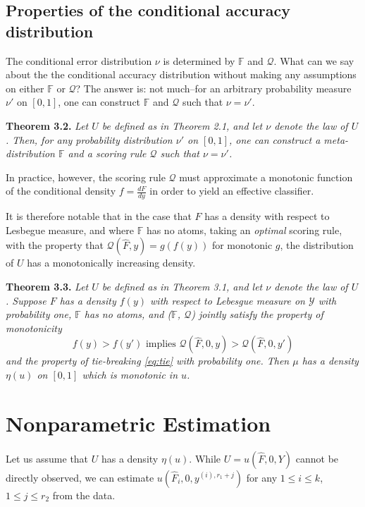 \documentclass{article}
\begin{document}
\subsection{Properties of the conditional accuracy distribution}

The conditional error distribution $\nu$ is determined by $\mathbb{F}$
and $\mathcal{Q}$.  What can we say about the the conditional accuracy
distribution without making any assumptions on either $\mathbb{F}$ or
$\mathcal{Q}$?  The answer is: not much--for an arbitrary probability
measure $\nu'$ on $[0,1]$, one can construct $\mathbb{F}$ and
$\mathcal{Q}$ such that $\nu = \nu'$.

\noindent\textbf{Theorem 3.2.} \emph{ Let $U$ be defined as in Theorem
  2.1, and let $\nu$ denote the law of $U$.  Then, for any probability
  distribution $\nu'$ on $[0,1]$, one can construct a
  meta-distribution $\mathbb{F}$ and a scoring rule $\mathcal{Q}$ such
  that $\nu = \nu'$.  }

In practice, however, the scoring rule $\mathcal{Q}$ must approximate
a monotonic function of the conditional density $f = \frac{dF}{dy}$ in order to
yield an effective classifier.

It is therefore notable that in the case that $F$ has a density with
respect to Lesbegue measure, and where $\mathbb{F}$ has no atoms,
taking an \emph{optimal} scoring rule, with the property that
$\mathcal{Q}(\hat{F}, y) = g(f(y))$ for monotonic $g$, the
distribution of $U$ has a monotonically increasing density.

\noindent\textbf{Theorem 3.3.} \emph{ Let $U$ be defined as in Theorem
  3.1, and let $\nu$ denote the law of $U$.  Suppose $F$ has a density
  $f(y)$ with respect to Lebesgue measure on $\mathcal{Y}$ with
  probability one, $\mathbb{F}$ has no atoms, and ($\mathbb{F}$,
  $\mathcal{Q}$) jointly satisfy the property of monotonicity
  \[
  f(y) > f(y') \text{ implies } \mathcal{Q}(\hat{F}, 0, y) > \mathcal{Q}(\hat{F}, 0, y')
  \]
  and the property of tie-breaking \eqref{eq:tie} with probability one.
  Then $\mu$ has a density $\eta(u)$ on $[0, 1]$ which is monotonic in $u$.
}

\section{Nonparametric Estimation}

Let us assume that $U$ has a density $\eta(u)$.  While $U = u(\hat{F},
0, Y)$ cannot be directly observed, we can estimate $u(\hat{F}_i, 0,
y^{(i), r_1 + j})$ for any $1 \leq i \leq k$, $1 \leq j \leq r_2$ from
the data.
\end{document}
